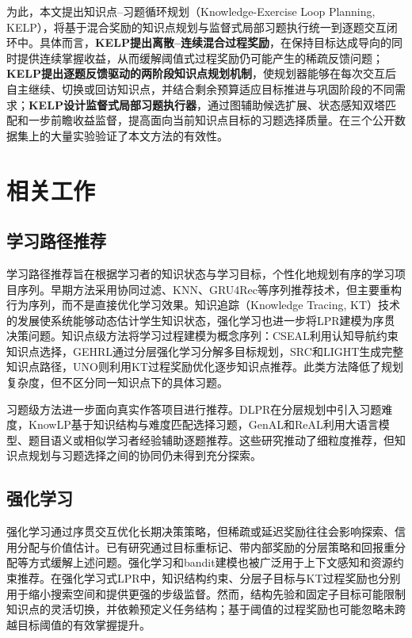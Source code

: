\documentclass[UTF8,a4paper,zihao=5,twocolumn]{ctexart}
\begin{document}
为此，本文提出知识点--习题循环规划（Knowledge-Exercise Loop Planning, KELP），将基于混合奖励的知识点规划与监督式局部习题执行统一到逐题交互闭环中。具体而言，\textbf{KELP提出离散--连续混合过程奖励}，在保持目标达成导向的同时提供连续掌握收益，从而缓解阈值式过程奖励仍可能产生的稀疏反馈问题；\textbf{KELP提出逐题反馈驱动的两阶段知识点规划机制}，使规划器能够在每次交互后自主继续、切换或回访知识点，并结合剩余预算适应目标推进与巩固阶段的不同需求；\textbf{KELP设计监督式局部习题执行器}，通过图辅助候选扩展、状态感知双塔匹配和一步前瞻收益监督，提高面向当前知识点目标的习题选择质量。在三个公开数据集上的大量实验验证了本文方法的有效性。
\section{相关工作}
\subsection{学习路径推荐}
学习路径推荐旨在根据学习者的知识状态与学习目标，个性化地规划有序的学习项目序列\cite{NabLR2020}。早期方法采用协同过滤、KNN、GRU4Rec等序列推荐技术\cite{CovH1967,HidKB2015}，但主要重构行为序列，而不是直接优化学习效果。知识追踪（Knowledge Tracing, KT）技术\cite{PieBH2015,SheHL2022,LiuGL2025}的发展使系统能够动态估计学生知识状态\cite{KubFM2021}，强化学习也进一步将LPR建模为序贯决策问题。知识点级方法将学习过程建模为概念序列：CSEAL利用认知导航约束知识点选择\cite{LiuTL2019}，GEHRL通过分层强化学习分解多目标规划\cite{LiXY2023}，SRC和LIGHT生成完整知识点路径\cite{CheSX2023,YuYW2025}，UNO则利用KT过程奖励优化逐步知识点推荐\cite{PenZC2026}。此类方法降低了规划复杂度，但不区分同一知识点下的具体习题。

习题级方法进一步面向真实作答项目进行推荐。DLPR在分层规划中引入习题难度\cite{ZhaSX2024}，KnowLP基于知识结构与难度匹配选择习题\cite{CheZW2025}，GenAL和ReAL利用大语言模型、题目语义或相似学习者经验辅助逐题推荐\cite{LvLG2025a,LvLG2025b}。这些研究推动了细粒度推荐，但知识点规划与习题选择之间的协同仍未得到充分探索。
\subsection{强化学习}
强化学习通过序贯交互优化长期决策策略，但稀疏或延迟奖励往往会影响探索、信用分配与价值估计。已有研究通过目标重标记、带内部奖励的分层策略和回报重分配等方式缓解上述问题\cite{AndWR2017,KulNS2016,ArjGG2019}。强化学习和bandit建模也被广泛用于上下文感知和资源约束推荐\cite{LiCL2010,PanCT2019,YanLQ2020}。在强化学习式LPR中，知识结构约束、分层子目标与KT过程奖励也分别用于缩小搜索空间和提供更强的步级监督\cite{LiuTL2019,LiXY2023,ZhaSX2024,PenZC2026}。然而，结构先验和固定子目标可能限制知识点的灵活切换，并依赖预定义任务结构；基于阈值的过程奖励也可能忽略未跨越目标阈值的有效掌握提升。
\end{document}
